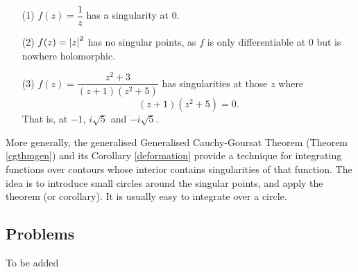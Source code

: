 \vspace*{1em}

\begin{example}\hfill
\begin{itemize}
\item[(1)] $f(z) = \dfrac{1}{z}$ has a singularity at $0$.
\item[(2)] $f(z) = \left\lvert z\right\rvert^2$ has no singular points, as $f$ is only differentiable at $0$ but is nowhere holomorphic.
\item[(3)] $f(z) = \dfrac{z^2 + 3}{(z + 1)(z^2 + 5)}$ has singularities at those $z$ where
\[(z + 1)(z^2 + 5) = 0.\]
That is, at $-1,\, i\sqrt{5}$ and $-i\sqrt{5}$.
\end{itemize}
\end{example}

\vspace*{1em}

\begin{remark}
More generally, the generalised Generalised Cauchy-Goursat Theorem (Theorem \ref{cgthmgen}) and its Corollary \ref{deformation} provide a technique for integrating functions over contours whose interior contains singularities of that function. The idea is to introduce small circles around the singular points, and apply the theorem (or corollary). It is usually easy to integrate over a circle. 
\end{remark}

\vspace*{2em}

\subsection{Problems}
\vspace{0.1in}
To be added
%
